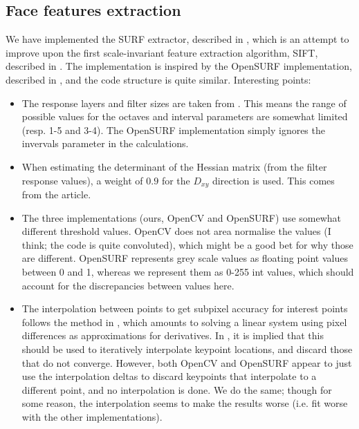 \subsection{Face features extraction}
We have implemented the SURF extractor, described in \cite{SURF},
which is an attempt to improve upon the first scale-invariant feature
extraction algorithm, SIFT, described in \cite{SIFT}. The
implementation is inspired by the OpenSURF implementation, described
in \cite{OpenSURF}, and the code structure is quite similar.
Interesting points:

\begin{itemize}
\item The response layers and filter sizes are taken from \cite{SURF}.
  This means the range of possible values for the octaves and interval
  parameters are somewhat limited (resp. 1-5 and 3-4). The OpenSURF
  implementation simply ignores the invervals parameter in the
  calculations.
\item When estimating the determinant of the Hessian matrix (from the
  filter response values), a weight of $0.9$ for the $D_{xy}$
  direction is used. This comes from the article.
\item The three implementations (ours, OpenCV and OpenSURF) use
  somewhat different threshold values. OpenCV does not area normalise
  the values (I think; the code is quite convoluted), which might be a
  good bet for why those are different. OpenSURF represents grey scale
  values as floating point values between 0 and 1, whereas we
  represent them as 0-255 int values, which should account for the
  discrepancies between values here.
\item The interpolation between points to get subpixel accuracy for
  interest points follows the method in \cite{inv-features}, which
  amounts to solving a linear system using pixel differences as
  approximations for derivatives. In \cite{SURF}, it is implied that
  this should be used to iteratively interpolate keypoint locations,
  and discard those that do not converge. However, both OpenCV and
  OpenSURF appear to just use the interpolation deltas to discard
  keypoints that interpolate to a different point, and no
  interpolation is done. We do the same; though for some reason, the
  interpolation seems to make the results worse (i.e. fit worse with
  the other implementations).
\end{itemize}
